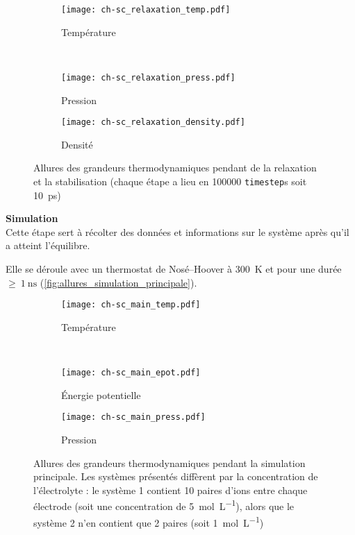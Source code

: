 \begin{figure}[h]
    \centering
    \begin{subfigure}[t]{.49\textwidth}
        \texttt{[image: ch-sc\_relaxation\_temp.pdf]}
        \caption{Température}
    \end{subfigure}%
    ~
    \begin{subfigure}[t]{.49\textwidth}
        \texttt{[image: ch-sc\_relaxation\_press.pdf]}
        \caption{Pression}
    \end{subfigure}
    \begin{subfigure}[t]{.49\textwidth}
        \texttt{[image: ch-sc\_relaxation\_density.pdf]}
        \caption{Densité}
    \end{subfigure}
    \caption{Allures des grandeurs thermodynamiques pendant de la relaxation et la stabilisation {\tiny (chaque étape a lieu en \num{100000} \lstinline!timestep!s soit \qty{10}{\pico \second})}}
    \label{fig:allures_thermostat_barostat}
\end{figure}

\textbf{Simulation}\\
Cette étape sert à récolter des données et informations sur le système après qu'il a atteint l'équilibre.

Elle se déroule avec un thermostat de Nosé--Hoover à \qty{300}{\kelvin} et pour une durée $\geq~\qty{1}{\nano \second}$ (\autoref{fig:allures_simulation_principale}).

\begin{figure}[h]
    \centering
    \begin{subfigure}[t]{.49\textwidth}
        \texttt{[image: ch-sc\_main\_temp.pdf]}
        \caption{Température}
    \end{subfigure}%
    ~
    \begin{subfigure}[t]{.49\textwidth}
        \texttt{[image: ch-sc\_main\_epot.pdf]}
        \caption{Énergie potentielle}
    \end{subfigure}
    \begin{subfigure}[t]{.49\textwidth}
        \texttt{[image: ch-sc\_main\_press.pdf]}
        \caption{Pression}
    \end{subfigure}
    \caption{Allures des grandeurs thermodynamiques pendant la simulation principale. Les systèmes présentés diffèrent par la concentration de l'électrolyte : le système 1 contient \num{10} paires d'ions entre chaque électrode (soit une concentration de \qty{5}{\mole \per \liter}), alors que le système 2 n'en contient que \num{2} paires (soit \qty{1}{\mole \per \liter})}
    \label{fig:allures_simulation_principale}
\end{figure}
